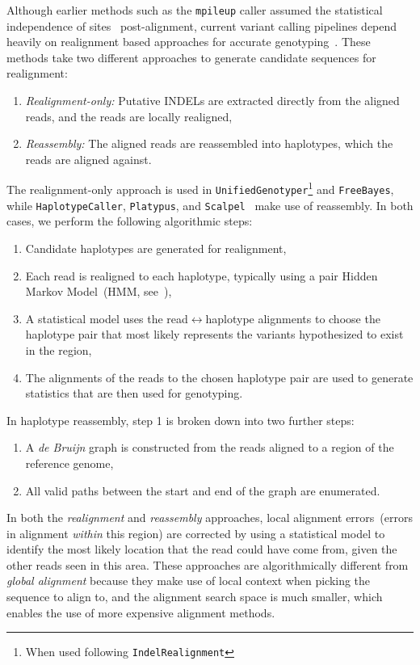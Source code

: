 \documentclass[masters]{ucbthesis}
\begin{document}
Although earlier methods such as the \texttt{mpileup} caller assumed the statistical independence of
sites~\cite{li11snp} post-alignment, current variant calling pipelines depend heavily on realignment based
approaches for accurate genotyping~\cite{li14}. These methods take two different approaches to generate candidate sequences for realignment:

\begin{enumerate}
\item \emph{Realignment-only:} Putative INDELs are extracted directly from the aligned reads, and the
reads are locally realigned,
\item \emph{Reassembly:} The aligned reads are reassembled into haplotypes, which the reads are
aligned against.
\end{enumerate}

The realignment-only approach is used in \texttt{UnifiedGenotyper}\footnote{When used following
\texttt{IndelRealignment}} and \texttt{FreeBayes}, while \texttt{HaplotypeCaller}, \texttt{Platypus}, and
\texttt{Scalpel}~\cite{narzisi14} make use of reassembly. In both cases, we perform the following
algorithmic steps:

\begin{enumerate}
\item Candidate haplotypes are generated for realignment,
\item Each read is realigned to each haplotype, typically using a pair Hidden Markov Model~(HMM,
see~\cite{durbin98}),
\item A statistical model uses the read$\leftrightarrow$haplotype alignments to choose the haplotype pair
that most likely represents the variants hypothesized to exist in the region, 
\item The alignments of the reads to the chosen haplotype pair are used to generate statistics that are
then used for genotyping.
\end{enumerate}

In haplotype reassembly, step 1 is broken down into two further steps:

\begin{enumerate}
\item A \emph{de Bruijn} graph is constructed from the reads aligned to a region of the reference genome,
\item All valid paths between the start and end of the graph are enumerated.
\end{enumerate}

In both the \emph{realignment} and \emph{reassembly} approaches, local alignment errors~(errors in
alignment \emph{within} this region) are corrected by using a statistical model to identify the most likely
location that the read could have come from, given the other reads seen in this area. These approaches
are algorithmically different from \emph{global alignment} because they make use of local context when
picking the sequence to align to, and the alignment search space is much smaller, which enables the use
of more expensive alignment methods.
\end{document}
